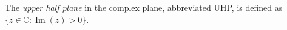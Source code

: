 \documentclass[12pt]{article}
\begin{document}
The \emph{upper half plane} in the complex plane, abbreviated UHP, is defined as $\{ z \in {\mathbb C}: \operatorname{Im}(z)>0 \}$.
\end{document}
